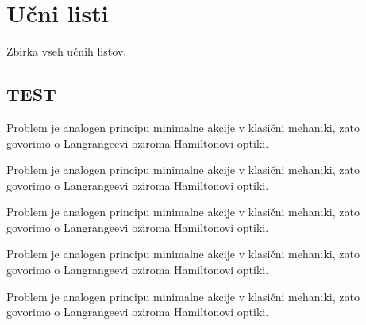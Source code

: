 
\chapter{Učni listi}
 
Zbirka vseh učnih listov.


\section{TEST}

\begin{example}
Problem je analogen principu minimalne akcije v klasični mehaniki, zato govorimo o 
Langrangeevi oziroma Hamiltonovi optiki.
\end{example}

\begin{exercise}
Problem je analogen principu minimalne akcije v klasični mehaniki, zato govorimo o 
Langrangeevi oziroma Hamiltonovi optiki.
\end{exercise}

\begin{definition}
Problem je analogen principu minimalne akcije v klasični mehaniki, zato govorimo o 
Langrangeevi oziroma Hamiltonovi optiki.
\end{definition}

\begin{remark}
Problem je analogen principu minimalne akcije v klasični mehaniki, zato govorimo o 
Langrangeevi oziroma Hamiltonovi optiki.
\end{remark}


\begin{theorem}
Problem je analogen principu minimalne akcije v klasični mehaniki, zato govorimo o 
Langrangeevi oziroma Hamiltonovi optiki.
\end{theorem}


